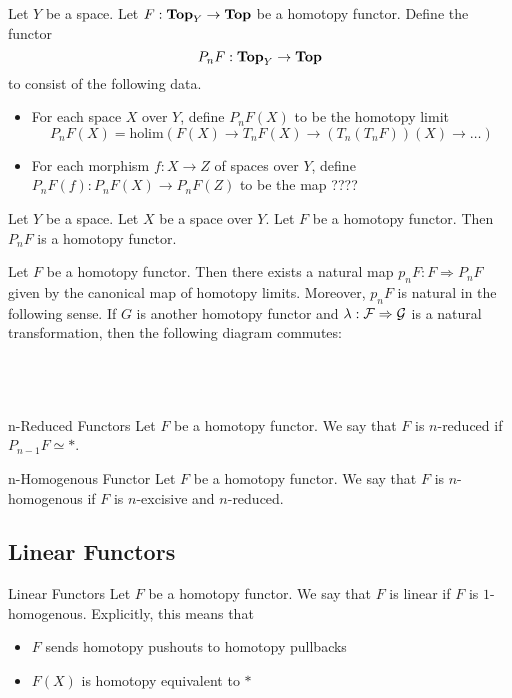 \documentclass[a4paper]{article}
\begin{document}
\begin{defn}{}{} Let $Y$ be a space. Let $F:\bold{Top}_Y\to\bold{Top}$ be a homotopy functor. Define the functor $$P_nF:\bold{Top}_Y\to\bold{Top}$$ to consist of the following data. 
\begin{itemize}
\item For each space $X$ over $Y$, define $P_nF(X)$ to be the homotopy limit $$P_nF(X)=\text{holim}(F(X)\to T_nF(X)\to(T_n(T_nF))(X)\to\dots)$$
\item For each morphism $f:X\to Z$ of spaces over $Y$, define $P_nF(f):P_nF(X)\to P_nF(Z)$ to be the map ????
\end{itemize}
\end{defn}

\begin{lmm}{}{} Let $Y$ be a space. Let $X$ be a space over $Y$. Let $F$ be a homotopy functor. Then $P_nF$ is a homotopy functor.   
\end{lmm}

\begin{prp}{}{} Let $F$ be a homotopy functor. Then there exists a natural map $p_nF:F\Rightarrow P_nF$ given by the canonical map of homotopy limits. Moreover, $p_nF$ is natural in the following sense. If $G$ is another homotopy functor and $\lambda:\mathcal{F}\Rightarrow\mathcal{G}$ is a natural transformation, then the following diagram commutes: \\~\\
\\~\\
\end{prp}

\begin{defn}{n-Reduced Functors}{} Let $F$ be a homotopy functor. We say that $F$ is $n$-reduced if $P_{n-1}F\simeq\ast$. 
\end{defn}

\begin{defn}{n-Homogenous Functor}{} Let $F$ be a homotopy functor. We say that $F$ is $n$-homogenous if $F$ is $n$-excisive and $n$-reduced. 
\end{defn}

\subsection{Linear Functors}
\begin{defn}{Linear Functors}{} Let $F$ be a homotopy functor. We say that $F$ is linear if $F$ is $1$-homogenous. Explicitly, this means that 
\begin{itemize}
\item $F$ sends homotopy pushouts to homotopy pullbacks
\item $F(X)$ is homotopy equivalent to $\ast$
\end{itemize}
\end{defn}
\end{document}

